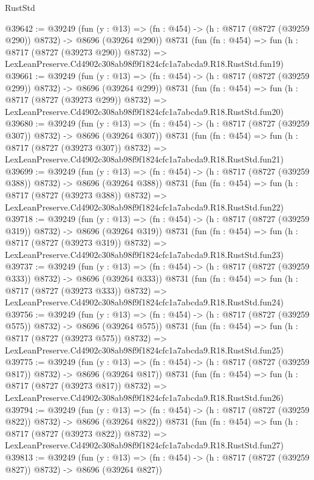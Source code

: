 \begin{lexlean}{RustStd}
\begin{coremodule}
@39642 := @39249
    (fun (y : @13) => (fn : @454) -> (h : @8717 (@8727 (@39259 @290)) @8732) -> @8696 (@39264 @290))
    @8731
    (fun (fn : @454) =>
    fun (h : @8717 (@8727 (@39273 @290)) @8732) =>
    LexLeanPreserve.Cd4902c308ab98f9f1824cfc1a7abcda9.R18.RustStd.fun19)
@39661 := @39249
    (fun (y : @13) => (fn : @454) -> (h : @8717 (@8727 (@39259 @299)) @8732) -> @8696 (@39264 @299))
    @8731
    (fun (fn : @454) =>
    fun (h : @8717 (@8727 (@39273 @299)) @8732) =>
    LexLeanPreserve.Cd4902c308ab98f9f1824cfc1a7abcda9.R18.RustStd.fun20)
@39680 := @39249
    (fun (y : @13) => (fn : @454) -> (h : @8717 (@8727 (@39259 @307)) @8732) -> @8696 (@39264 @307))
    @8731
    (fun (fn : @454) =>
    fun (h : @8717 (@8727 (@39273 @307)) @8732) =>
    LexLeanPreserve.Cd4902c308ab98f9f1824cfc1a7abcda9.R18.RustStd.fun21)
@39699 := @39249
    (fun (y : @13) => (fn : @454) -> (h : @8717 (@8727 (@39259 @388)) @8732) -> @8696 (@39264 @388))
    @8731
    (fun (fn : @454) =>
    fun (h : @8717 (@8727 (@39273 @388)) @8732) =>
    LexLeanPreserve.Cd4902c308ab98f9f1824cfc1a7abcda9.R18.RustStd.fun22)
@39718 := @39249
    (fun (y : @13) => (fn : @454) -> (h : @8717 (@8727 (@39259 @319)) @8732) -> @8696 (@39264 @319))
    @8731
    (fun (fn : @454) =>
    fun (h : @8717 (@8727 (@39273 @319)) @8732) =>
    LexLeanPreserve.Cd4902c308ab98f9f1824cfc1a7abcda9.R18.RustStd.fun23)
@39737 := @39249
    (fun (y : @13) => (fn : @454) -> (h : @8717 (@8727 (@39259 @333)) @8732) -> @8696 (@39264 @333))
    @8731
    (fun (fn : @454) =>
    fun (h : @8717 (@8727 (@39273 @333)) @8732) =>
    LexLeanPreserve.Cd4902c308ab98f9f1824cfc1a7abcda9.R18.RustStd.fun24)
@39756 := @39249
    (fun (y : @13) => (fn : @454) -> (h : @8717 (@8727 (@39259 @575)) @8732) -> @8696 (@39264 @575))
    @8731
    (fun (fn : @454) =>
    fun (h : @8717 (@8727 (@39273 @575)) @8732) =>
    LexLeanPreserve.Cd4902c308ab98f9f1824cfc1a7abcda9.R18.RustStd.fun25)
@39775 := @39249
    (fun (y : @13) => (fn : @454) -> (h : @8717 (@8727 (@39259 @817)) @8732) -> @8696 (@39264 @817))
    @8731
    (fun (fn : @454) =>
    fun (h : @8717 (@8727 (@39273 @817)) @8732) =>
    LexLeanPreserve.Cd4902c308ab98f9f1824cfc1a7abcda9.R18.RustStd.fun26)
@39794 := @39249
    (fun (y : @13) => (fn : @454) -> (h : @8717 (@8727 (@39259 @822)) @8732) -> @8696 (@39264 @822))
    @8731
    (fun (fn : @454) =>
    fun (h : @8717 (@8727 (@39273 @822)) @8732) =>
    LexLeanPreserve.Cd4902c308ab98f9f1824cfc1a7abcda9.R18.RustStd.fun27)
@39813 := @39249
    (fun (y : @13) => (fn : @454) -> (h : @8717 (@8727 (@39259 @827)) @8732) -> @8696 (@39264 @827))

\end{coremodule}
\end{lexlean}
